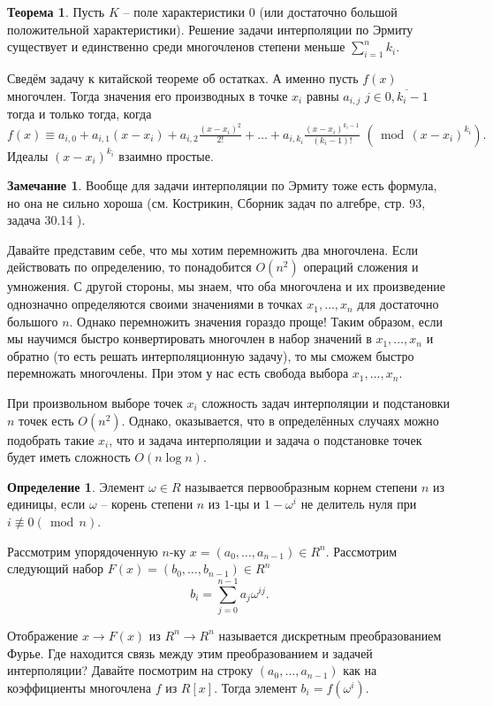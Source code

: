 \documentclass[10pt,a4paper,oneside]{book}
\theoremstyle{definition}
\newtheorem*{rem}{Замечание}
\newtheorem*{defn}{Определение}
\newtheorem{thm}{Теорема}
\renewcommand{\mod}{\,\operatorname{mod}\,}
\newcommand{\ovl}{\overline}
\newcommand{\nequiv}{\not \equiv}
\def\thrm{\begin{thm}}
\def\ethrm{\end{thm}}
\def\dfn{\begin{defn}}
\def\edfn{\end{defn}}
\def\rm{\begin{rem}}
\def\erm{\end{rem}}
\begin{document}
\thrm Пусть $K$ -- поле характеристики 0 (или достаточно большой положительной характеристики). Решение задачи интерполяции по Эрмиту существует и единственно среди многочленов степени меньше $\sum_{i=1}^n k_i$.
\ethrm
\proof Сведём задачу к китайской теореме об остатках. А именно пусть $f(x)$ многочлен. Тогда значения его производных в точке $x_i$ равны $a_{i,j}$ $j\in \ovl{0,k_i-1}$ тогда и только тогда, когда
$$f(x)\equiv a_{i,0}+a_{i,1}(x-x_i)+a_{i,2}\tfrac{(x-x_i)^2}{2!}+\dots+ a_{i,k_i}\tfrac{(x-x_i)^{k_i-1}}{(k_i-1)!}\,\, (\mod (x-x_i)^{k_i}).$$
Идеалы $(x-x_i)^{k_i}$ взаимно простые.
\endproof

\rm Вообще для  задачи интерполяции по Эрмиту тоже есть формула, но она не сильно хороша (см. Кострикин, Сборник задач по алгебре, стр. 93, задача 30.14 ).\erm


Давайте представим себе, что мы хотим перемножить два многочлена. Если действовать по определению, то понадобится $O(n^2)$ операций сложения и умножения. С другой стороны, мы знаем, что оба многочлена и их произведение однозначно определяются своими значениями в точках $x_1,\dots, x_n$ для достаточно большого $n$. Однако перемножить значения гораздо проще! Таким образом, если мы научимся быстро конвертировать многочлен в набор значений в $x_1,\dots, x_n$ и обратно (то есть решать интерполяционную задачу), то мы сможем быстро перемножать многочлены. При этом у нас есть свобода выбора $x_1,\dots, x_n$.

При произвольном выборе точек $x_i$ сложность задач интерполяции и подстановки $n$ точек есть $O(n^2)$. Однако, оказывается, что в определённых случаях можно подобрать такие $x_i$, что и задача интерполяции и задача о подстановке точек будет иметь сложность $O(n\log n)$.

\dfn Элемент  $\omega \in R$ называется первообразным корнем  степени $n$ из единицы, если $\omega$ -- корень степени $n$ из $1$-цы и $1-\omega^i$ не делитель нуля при $i\nequiv 0(\mod n)$.
\edfn




Рассмотрим упорядоченную $n$-ку $x=(a_0,\dots,a_{n-1})\in R^n$. Рассмотрим следующий набор $F(x)=(b_0,\dots,b_{n-1})\in R^n$
$$b_i=\sum_{j=0}^{n-1} a_j \omega^{ij}.$$

Отображение $x \to F(x)$ из $ R^n \to R^n$ называется дискретным преобразованием Фурье. Где находится связь между этим преобразованием и задачей интерполяции? Давайте посмотрим на строку $(a_0,\dots,a_{n-1})$ как на коэффициенты многочлена $f$ из $R[x]$. Тогда элемент $b_i=f(\omega^i)$.
\end{document}
